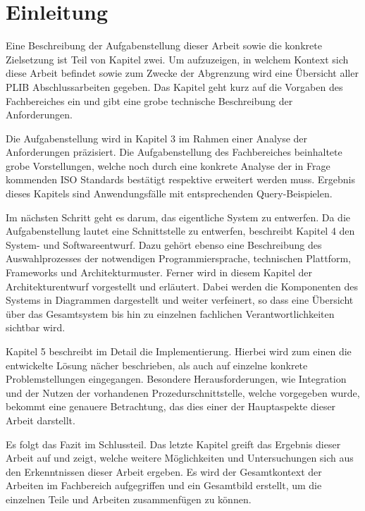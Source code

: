
\chapter{Einleitung}\label{sec:einleitung}


Eine Beschreibung der Aufgabenstellung dieser Arbeit sowie die konkrete Zielsetzung ist Teil von Kapitel zwei. Um aufzuzeigen, in welchem Kontext sich diese Arbeit befindet sowie zum Zwecke der Abgrenzung wird eine Übersicht aller PLIB Abschlussarbeiten gegeben. Das Kapitel geht kurz auf die Vorgaben des Fachbereiches ein und gibt eine grobe technische Beschreibung der Anforderungen.

Die Aufgabenstellung wird in Kapitel 3 im Rahmen einer Analyse der Anforderungen präzisiert. Die Aufgabenstellung des Fachbereiches beinhaltete grobe Vorstellungen, welche noch durch eine konkrete Analyse der in Frage kommenden ISO Standards bestätigt respektive erweitert werden muss. Ergebnis dieses Kapitels sind Anwendungsfälle mit entsprechenden Query-Beispielen. 

Im nächsten Schritt geht es darum, das eigentliche System zu entwerfen. Da die Aufgabenstellung lautet eine Schnittstelle zu entwerfen, beschreibt Kapitel 4 den System- und Softwareentwurf. Dazu gehört ebenso eine Beschreibung des Auswahlprozesses der notwendigen Programmiersprache, technischen Plattform, Frameworks und Architekturmuster. 
Ferner wird in diesem Kapitel der Architekturentwurf vorgestellt und erläutert. Dabei werden die Komponenten des Systems in Diagrammen dargestellt und weiter verfeinert, so dass eine Übersicht über das Gesamtsystem bis hin zu einzelnen fachlichen Verantwortlichkeiten sichtbar wird. 

Kapitel 5 beschreibt im Detail die Implementierung. Hierbei wird zum einen die entwickelte Lösung nächer beschrieben, als auch auf einzelne konkrete Problemstellungen eingegangen. Besondere Herausforderungen, wie Integration und der Nutzen der vorhandenen Prozedurschnittstelle, welche vorgegeben wurde, bekommt eine genauere Betrachtung, das dies einer der Hauptaspekte dieser Arbeit darstellt. 

Es folgt das Fazit im Schlussteil. Das letzte Kapitel greift das Ergebnis dieser Arbeit auf und zeigt, welche weitere Möglichkeiten und Untersuchungen sich aus den Erkenntnissen dieser Arbeit ergeben. Es wird der Gesamtkontext der Arbeiten im Fachbereich aufgegriffen und ein Gesamtbild erstellt, um die einzelnen Teile und Arbeiten zusammenfügen zu können.     
 

		